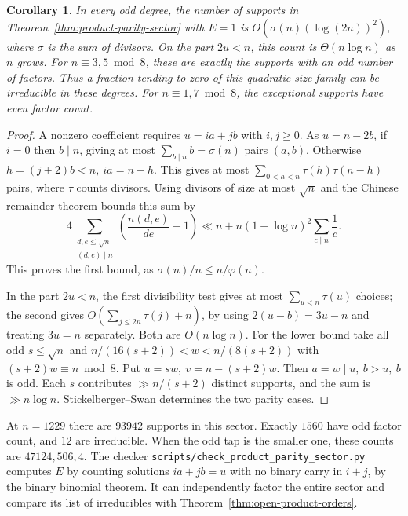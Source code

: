 \documentclass[11pt]{article}
\newtheorem{corollary}[theorem]{Corollary}
\begin{document}
\begin{corollary}\label{cor:product-sector-size}
In every odd degree, the number of supports in
Theorem~\ref{thm:product-parity-sector} with \(E=1\) is
\(O(\sigma(n)(\log(2n))^2)\), where \(\sigma\) is the sum of divisors.
On the part \(2u<n\), this count is \(\Theta(n\log n)\) as \(n\)
grows. For \(n\equiv3,5\bmod8\), these are exactly the supports
with an odd number of factors. Thus a fraction tending to zero of
this quadratic-size family can be irreducible in these degrees.
For \(n\equiv1,7\bmod8\), the exceptional supports have even factor count.
\end{corollary}
\begin{proof}
A nonzero coefficient requires \(u=ia+jb\) with \(i,j\ge0\).
As \(u=n-2b\), if \(i=0\) then \(b\mid n\), giving at most
\(\sum_{b\mid n}b=\sigma(n)\) pairs \((a,b)\).
Otherwise \(h=(j+2)b<n,\ ia=n-h\). This gives at most
\(\sum_{0<h<n}\tau(h)\tau(n-h)\) pairs, where \(\tau\) counts divisors.
Using divisors of size at most \(\sqrt n\) and the Chinese remainder
theorem bounds this sum by
\[
 4\sum_{\substack{d,e\le\sqrt n\\(d,e)\mid n}}
 \left(\frac{n(d,e)}{de}+1\right)
 \ll n+n(1+\log n)^2\sum_{c\mid n}\frac1c .
\]
This proves the first bound, as \(\sigma(n)/n\le n/\varphi(n)\).

In the part \(2u<n\), the first divisibility test gives at most
\(\sum_{u<n}\tau(u)\) choices; the second gives
\(O(\sum_{j\le 2n}\tau(j)+n)\), by using \(2(u-b)=3u-n\)
and treating \(3u=n\) separately. Both are \(O(n\log n)\).
For the lower bound take all odd \(s\le\sqrt n\) and
\(n/(16(s+2))<w<n/(8(s+2))\) with
\((s+2)w\equiv n\bmod8\). Put \(u=sw,\ v=n-(s+2)w\).
Then \(a=w\mid u,\ b>u,\ b\) is odd. Each \(s\) contributes
\(\gg n/(s+2)\) distinct supports, and the sum is \(\gg n\log n\).
Stickelberger--Swan determines the two parity cases.
\end{proof}

At \(n=1229\) there are \(93942\) supports in this sector.
Exactly \(1560\) have odd factor count, and \(12\) are irreducible.
When the odd tap is the smaller one, these counts are \(47124,506,4\).
The checker \nolinkurl{scripts/check_product_parity_sector.py}
computes \(E\) by counting solutions \(ia+jb=u\) with no binary
carry in \(i+j\), by the binary binomial theorem. It can independently
factor the entire sector and compare its list of irreducibles with
Theorem~\ref{thm:open-product-orders}.
\end{document}
